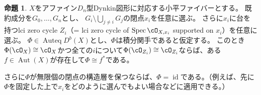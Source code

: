 \documentclass[uplatex, a4paper, dvipdfmx]{jsarticle}
\theoremstyle{definition}
\newtheorem{proposition}[theorem]{命題}
\DeclareMathOperator{\Auteq}{\mathrm{Auteq}}
\DeclareMathOperator{\id}{\mathrm{id}}
\DeclareMathOperator{\Aut}{\mathrm{Aut}}
\DeclareMathOperator{\Spec}{\mathrm{Spec}}
\begin{document}
\begin{proposition}
    $X$をアファイン$D_n$型Dynkin図形に対応する小平ファイバーとする。
    既約成分を$G_0, \dots, G_n$とし、
    $G_i \setminus \bigcup_{j \neq i}G_j$の閉点$x_i$を任意に選ぶ。
    さらに$x_i$に台を持つlci zero cycle $Z_i$（= lci zero cycle of $\Spec \cO_{X, x_i}$ supported on $x_i$）を任意に選ぶ。
    $\Phi \in \Auteq D^b(X)$とし、$\Phi$は積分関手であると仮定する。
    このとき$\Phi(\cO_X) \cong \cO_X$かつ全ての$i$について$\Phi(\cO_{Z_i}) \cong \cO_{Z_i}$ならば、ある$f \in \Aut(X)$が存在して$\Phi \cong f^*$である。

    さらに$\Phi$が無限個の閉点の構造層を保つならば、$\Phi = \id$である。（例えば、先に$\Phi$を固定した上で$x_i$をどのように選んでもよい場合などに適用できる。）
\end{proposition}
\end{document}
